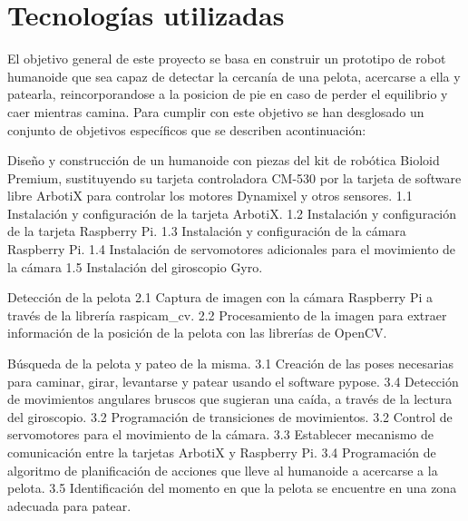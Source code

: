 \chapter{Tecnologías utilizadas}\label{chapter:presentacion_del_problema}

El objetivo general de este proyecto se basa en construir un prototipo de robot humanoide que sea capaz de detectar la cercanía
de una pelota, acercarse a ella y patearla, reincorporandose a la posicion de pie en caso de perder el equilibrio y caer
mientras camina. Para cumplir con este objetivo se han desglosado un conjunto de objetivos específicos que se describen 
acontinuación: 

Diseño y construcción de un humanoide con piezas del kit de robótica Bioloid Premium, sustituyendo su tarjeta controladora
CM-530 por la tarjeta de software libre ArbotiX para controlar los motores Dynamixel y otros sensores. 
1.1 Instalación y configuración de la tarjeta ArbotiX.
1.2 Instalación y configuración de la tarjeta Raspberry Pi.
1.3 Instalación y configuración de la cámara Raspberry Pi.
1.4 Instalación de servomotores adicionales para el movimiento de la cámara
1.5 Instalación del giroscopio Gyro.
 
Detección de la pelota
2.1 Captura de imagen con la cámara Raspberry Pi a través de la librería raspicam_cv.
2.2 Procesamiento de la imagen para extraer información de la posición de la pelota con las librerías de OpenCV.

Búsqueda de la pelota y pateo de la misma. 
3.1 Creación de las poses necesarias para caminar, girar, levantarse y patear usando el software pypose.
3.4 Detección de movimientos angulares bruscos que sugieran una caída, a través de la lectura del giroscopio. 
3.2 Programación de transiciones de movimientos.
3.2 Control de servomotores para el movimiento de la cámara.
3.3 Establecer mecanismo de comunicación entre la tarjetas ArbotiX y Raspberry Pi.  
3.4 Programación de algoritmo de planificación de acciones que lleve al humanoide a acercarse a la pelota.
3.5 Identificación del momento en que la pelota se encuentre en una zona adecuada para patear.

 
